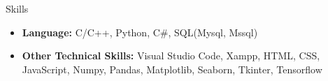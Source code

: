 \begin{rSection}{Skills}
    \begin{itemize}
        \item \textbf{Language:} C/C++, Python, C\#, SQL(Mysql, Mssql)
        \item \textbf{Other Technical Skills:} Visual Studio Code, Xampp, HTML, CSS, JavaScript, Numpy, Pandas, Matplotlib, Seaborn, Tkinter, Tensorflow
    \end{itemize}
\end{rSection}
